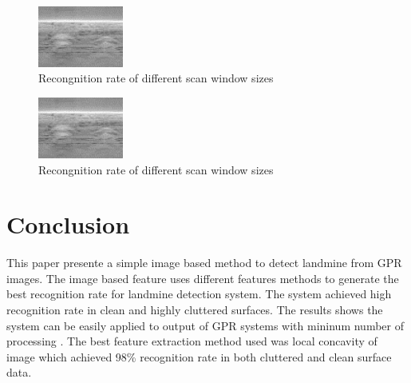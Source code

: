 \documentclass[conference]{IEEEtran}
\begin{document}
  \begin{figure}
\centering
\label{fig:ResultMineRock}
\includegraphics[width=0.25\textwidth]{images/MineCleanX0.jpg}
 \caption{Recongnition rate of different scan window sizes}
\end{figure}
  \begin{figure}
\centering
\label{fig:ResultMineClean}
\includegraphics[width=0.25\textwidth]{images/MineCleanX0.jpg}
 \caption{Recongnition rate of different scan window sizes}
\end{figure}


\section {Conclusion}
\label{sec:con}
This paper presente a simple image based method to detect landmine from GPR images. The image based feature uses different features methods to generate the best recognition rate for landmine detection system. The system achieved high recognition rate in clean and highly cluttered surfaces. The results shows the system can be easily applied to output of GPR systems with  mininum number of processing . The best feature extraction method used was local concavity of image which achieved 98\% recognition rate in both cluttered and clean surface data.






\end{document}
